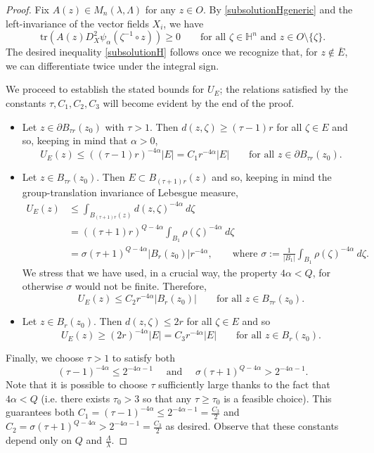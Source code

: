 \documentclass[12pt]{amsart}
\def \tr {\mathrm{tr}}
\def \Hn {{\mathbb H}^n}
\def \a {\alpha}
\def \t {\tau}
\def \tr {\mathrm{tr}}
\begin{document}
\begin{proof} 
Fix $A(z)\in M_n(\lambda,\Lambda)$ for any $z\in O$. By \eqref{subsolutionHgeneric} and the left-invariance of the vector fields $X_i$, we have
$$\tr \left(A(z) D^2_X \psi_{\a}(\zeta^{-1}\circ z)\right) \geq 0 \qquad  \text{for all }\zeta\in \Hn \text{ and }  z \in O \setminus\{\zeta\}.$$
The desired inequality \eqref{subsolutionH} follows once we recognize that, for $z\notin\overline{E}$, we can differentiate twice under the integral sign.

We proceed to establish the stated bounds for $U_E$; the relations satisfied by the constants $\t, C_1, C_2, C_3$ will become evident by the end of the proof. 
\begin{itemize}
\item[(i)] Let $z \in \partial B_{\t r}(z_0)$ with $\t>1$. Then $d(z,\zeta) \geq (\t - 1)r$ for all $\zeta \in E$ and so, keeping in mind that $\a>0$,
$$U_E(z) \leq ((\t - 1)r)^{-4\a}|E| = C_1 r^{-4\a}|E| \qquad \text{for all } z \in \partial B_{\t r}(z_0).$$
\item[(ii)] Let $z \in B_{\t r}(z_0)$. Then $E \subset B_{(\t + 1) r}(z)$ and so, keeping in mind the group-translation invariance of  Lebesgue measure,
\begin{align*}
U_E(z) & \leq \int_{B_{(\t +1) r}(z)} d(z,\zeta)^{-4\a} \ d\zeta \\
& = ((\t + 1)r)^{Q - 4\a} \int_{B_1} \rho(\zeta)^{-4\a} \ d\zeta \\
& = \sigma (\t + 1)^{Q - 4\a} |B_r(z_0)| r^{-4\a}, \qquad \text{where } \sigma := \frac{1}{|B_1|} \int_{B_1} \rho(\zeta)^{-4\a} \ d \zeta.
\end{align*}
We stress that we have used, in a crucial way, the property $4\a<Q$, for otherwise $\sigma$ would not be finite. Therefore,
$$U_E(z) \leq C_2 r^{-4\a}|B_r(z_0)| \qquad \text{for all } z \in B_{\t r}(z_0).$$
\item[(iii)] Let $z \in B_r(z_0)$. Then $d(z,\zeta) \leq 2r$ for all $\zeta \in E$ and so
$$U_E(z) \geq (2r)^{-4\a}|E| = C_3r^{-4\a}|E| \qquad \text{for all } z \in B_r(z_0).$$
\end{itemize}
Finally, we choose $\t > 1$ to satisfy both 
$$(\t - 1)^{-4\a} \leq 2^{-4\a-1}\quad\mbox{ and }\quad\sigma (\t + 1)^{Q - 4\a} > 2^{-4\alpha-1}.$$ 
Note that it is possible to choose $\tau$ sufficiently large thanks to the fact that $4\a<Q$ (i.e. there exists $\t_0>3$ so that any $\t\geq \t_0$ is a feasible choice). This guarantees both $C_1=(\t - 1)^{-4\a} \leq 2^{-4\a-1}= \frac{C_3}{2}$ and $C_2=\sigma (\t + 1)^{Q - 4\a}>2^{-4\a-1}= \frac{C_3}{2}$ as desired. Observe that these constants depend only on $Q$ and $\frac{\Lambda}{\lambda}$.
\end{proof}
\end{document}
